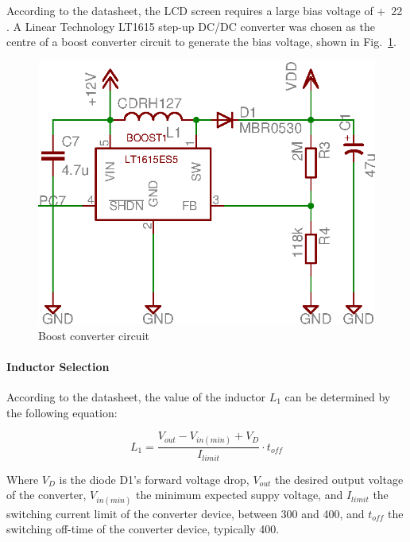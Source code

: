 According to the datasheet, the LCD screen requires a large bias voltage of \unit{+22}{\volt} \cite{LCD_Module}. A Linear Technology LT1615 step-up DC/DC converter was chosen as the centre of a boost converter circuit to generate the bias voltage, shown in Fig.\ \ref{fig:lcd_boost_converter}.

\begin{figure}[htp]
 \centering
 \includegraphics[scale=0.8]{implementation/figures/driver_interface_lcd_bias_circuit.eps}
 \caption{Boost converter circuit}
 \label{fig:lcd_boost_converter}
\end{figure}

\paragraph{Inductor Selection}

According to the datasheet, the value of the inductor $L_1$ can be determined by the following equation:

\begin{equation}
L_1=\frac{V_{out}-V_{in(min)}+V_{D}}{I_{limit}}\cdot t_{off}\label{IndSel}
\end{equation}

Where $V_D$ is the diode D1's forward voltage drop, $V_{out}$ the desired output voltage of the converter, $V_{in(min)}$ the minimum expected suppy voltage, and $I_{limit}$ the switching current limit of the converter device, between \unit{300}{\milli\ampere} and \unit{400}{\milli\ampere}, and $t_{off}$ the switching off-time of the converter device, typically \unit{400}{\nano\second}.

